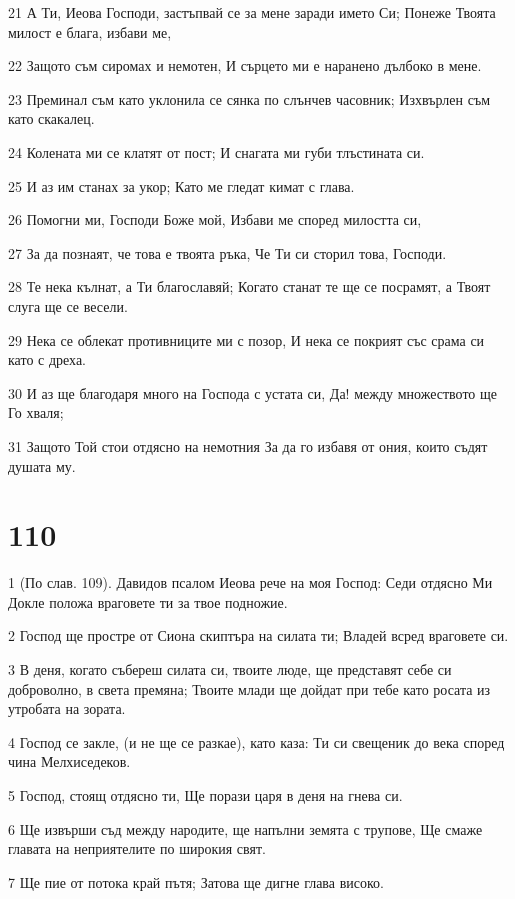 \par 21 А Ти, Иеова Господи, застъпвай се за мене заради името Си; Понеже Твоята милост е блага, избави ме,
\par 22 Защото съм сиромах и немотен, И сърцето ми е наранено дълбоко в мене.
\par 23 Преминал съм като уклонила се сянка по слънчев часовник; Изхвърлен съм като скакалец.
\par 24 Колената ми се клатят от пост; И снагата ми губи тлъстината си.
\par 25 И аз им станах за укор; Като ме гледат кимат с глава.
\par 26 Помогни ми, Господи Боже мой, Избави ме според милостта си,
\par 27 За да познаят, че това е твоята ръка, Че Ти си сторил това, Господи.
\par 28 Те нека кълнат, а Ти благославяй; Когато станат те ще се посрамят, а Твоят слуга ще се весели.
\par 29 Нека се облекат противниците ми с позор, И нека се покрият със срама си като с дреха.
\par 30 И аз ще благодаря много на Господа с устата си, Да! между множеството ще Го хваля;
\par 31 Защото Той стои отдясно на немотния За да го избавя от ония, които съдят душата му.

\chapter{110}

\par 1 (По слав. 109). Давидов псалом Иеова рече на моя Господ: Седи отдясно Ми Докле положа враговете ти за твое подножие.
\par 2 Господ ще простре от Сиона скиптъра на силата ти; Владей всред враговете си.
\par 3 В деня, когато събереш силата си, твоите люде, ще представят себе си доброволно, в света премяна; Твоите млади ще дойдат при тебе като росата из утробата на зората.
\par 4 Господ се закле, (и не ще се разкае), като каза: Ти си свещеник до века според чина Мелхиседеков.
\par 5 Господ, стоящ отдясно ти, Ще порази царя в деня на гнева си.
\par 6 Ще извърши съд между народите, ще напълни земята с трупове, Ще смаже главата на неприятелите по широкия свят.
\par 7 Ще пие от потока край пътя; Затова ще дигне глава високо.

